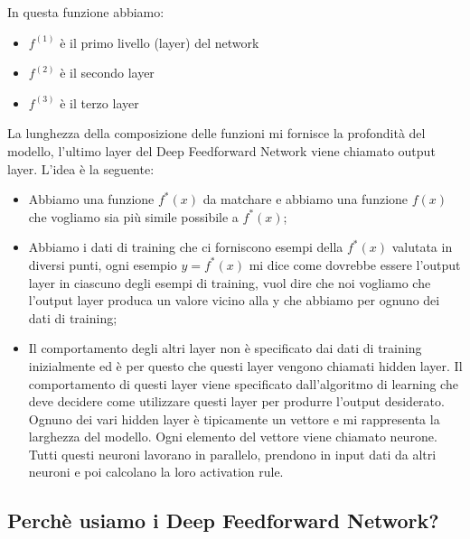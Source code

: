 \documentclass[14pt]{extreport}
\begin{document}
In questa funzione abbiamo:
\begin{itemize}
\item $f^(1)$ è il primo livello (layer) del network
\item $f^(2)$ è il secondo layer
\item $f^(3)$ è il terzo layer
\end{itemize}

La lunghezza della composizione delle funzioni mi fornisce la profondità del modello, l'ultimo layer del Deep Feedforward Network viene chiamato
output layer. L'idea è la seguente:
\begin{itemize}
\item Abbiamo una funzione $f^*(x)$ da matchare e abbiamo una funzione $f(x)$ che vogliamo sia più simile possibile a $f^*(x)$;
\item Abbiamo i dati di training che ci forniscono esempi della $f^*(x)$ valutata in diversi punti, ogni esempio $y = f^*(x)$ mi dice come dovrebbe
essere l'output layer in ciascuno degli esempi di training, vuol dire che noi vogliamo che l'output layer produca un valore vicino alla y che abbiamo
per ognuno dei dati di training;
\item Il comportamento degli altri layer non è specificato dai dati di training inizialmente ed è per questo che questi layer vengono chiamati hidden
layer. Il comportamento di questi layer viene specificato dall'algoritmo di learning che deve decidere come utilizzare questi layer per produrre
l'output desiderato. Ognuno dei vari hidden layer è tipicamente un vettore e mi rappresenta la larghezza del modello. Ogni elemento del vettore viene
chiamato neurone. Tutti questi neuroni lavorano in parallelo, prendono in input dati da altri neuroni e poi calcolano la loro activation rule.
\end{itemize}


\subsection{Perchè usiamo i Deep Feedforward Network?}
\end{document}
